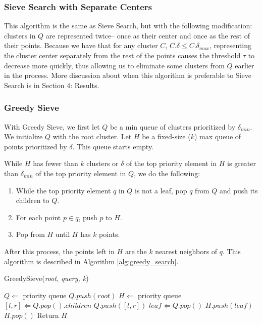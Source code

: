 \subsubsection{Sieve Search with Separate Centers}
\label{subsubsec:methods:knn-search:sieve2}
This algorithm is the same as Sieve Search, but with the following modification: clusters 
in $Q$ are represented twice-- once as their center and once as the rest of their points. 
Because we have that for any cluster $C$, $C.\delta \leq C.\delta_{max}$, representing the cluster 
center separately from the rest of the points causes the threshold $\tau$ to decrease more quickly, 
thus allowing us to eliminate some clusters from $Q$ earlier in the process. More discussion about 
when this algorithm is preferable to Sieve Search is in Section 4: Results. 


\subsubsection{Greedy Sieve}
\label{subsubsec:methods:knn-search:greedy-search}

With Greedy Sieve, we first let $Q$ be a min queue of clusters prioritized by $\delta_{min}$. We initialize $Q$ with the root cluster.
Let $H$ be a fixed-size ($k$) max queue of points prioritized by $\delta$. This queue starts empty.

While $H$ has fewer than $k$ clusters or $\delta$ of the top priority element in $H$ is greater 
than $\delta_{min}$ of the top priority element in $Q$, we do the following:
\begin{enumerate}
\item While the top priority element $q$ in $Q$ is not a leaf, pop $q$ from $Q$ and push its children to $Q$.
\item For each point $p \in q$, push $p$ to $H$. 
\item Pop from $H$ until $H$ has $k$ points. 
\end{enumerate}
After this process, the points left in $H$ are the $k$ nearest neighbors of $q$. This algorithm is described in Algorithm \ref{alg:greedy_search}.

\begin{algorithm} 
\caption{GreedySieve(\emph{root, query, k})} 
\label{alg:greedy_search} 
\begin{algorithmic}
    \STATE $Q \Leftarrow$ priority queue
    \STATE $Q.push(root)$
    \STATE $H \Leftarrow$ priority queue
            \STATE $[l, r] \Leftarrow Q.pop().children$
            \STATE $Q.push([l, r])$
        \ENDWHILE
        \STATE $leaf \Leftarrow Q.pop()$
        \STATE $H.push(leaf)$
            \STATE $H.pop()$
        \ENDWHILE
    \ENDWHILE
    \STATE Return $H$
\end{algorithmic}
\end{algorithm}

